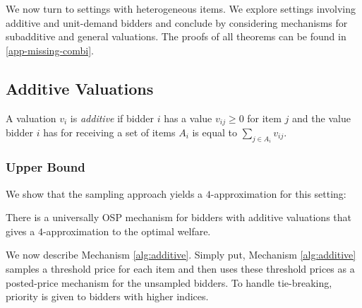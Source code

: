 We now turn to settings with heterogeneous items.
We explore settings involving additive and unit-demand bidders and conclude by considering mechanisms for subadditive and general valuations.
The proofs of all theorems can be found in 
\cref{app-missing-combi}. 
\subsection{Additive Valuations}
A valuation $v_i$ is \emph{additive} if bidder $i$ has a value $v_{ij} \geq 0$ for item $j$ and the value bidder $i$ has for receiving a set of items $A_i$ is equal to $\sum_{j \in A_i}{v_{ij}}$. 
\subsubsection{Upper Bound}
We show that the sampling approach yields a $4$-approximation for this setting:
\begin{theorem}\label{thm-ub-add}
    There is a universally OSP mechanism for bidders with additive valuations that gives a $4$-approximation to the optimal welfare.
\end{theorem}
We now describe Mechanism \ref{alg:additive}. Simply put, Mechanism \ref{alg:additive} samples a threshold price for each item and then uses these threshold prices as a posted-price mechanism for the unsampled bidders. To handle tie-breaking, priority is given to bidders with higher indices. 
